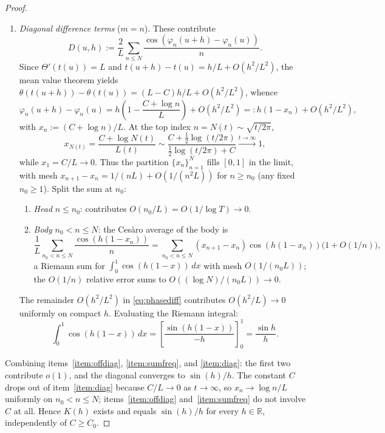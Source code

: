 \documentclass[12pt]{amsart}
\theoremstyle{remark}
\begin{document}
\begin{proof}
\begin{enumerate}
\item\label{item:diag}
\emph{Diagonal difference terms} ($m=n$).  These contribute
\[
  D(u,h):=\frac{2}{L}\sum_{n\leq N}\frac{\cos(\varphi_n(u+h)-\varphi_n(u))}{n}.
\]
Since $\Theta'(t(u))=L$ and $t(u+h)-t(u)=h/L+O(h^2/L^2)$, the mean
value theorem yields $\theta(t(u+h))-\theta(t(u))=(L-C)h/L+O(h^2/L^2)$,
whence
\begin{equation}\label{eq:phasediff}
  \varphi_n(u+h)-\varphi_n(u)
  =h\!\left(1-\frac{C+\log n}{L}\right)+O(h^2/L^2)
  =:h(1-x_n)+O(h^2/L^2),
\end{equation}
with $x_n:=(C+\log n)/L$.  At the top index $n=N(t)\sim\sqrt{t/2\pi}$,
\[
  x_{N(t)}=\frac{C+\log N(t)}{L(t)}
  \sim\frac{C+\tfrac12\log(t/2\pi)}{\tfrac12\log(t/2\pi)+C}
  \xrightarrow{t\to\infty}1,
\]
while $x_1=C/L\to 0$.  Thus the partition $\{x_n\}_{n=1}^{N}$ fills
$[0,1]$ in the limit, with mesh $x_{n+1}-x_n=1/(nL)+O(1/(n^2L))$ for
$n\geq n_0$ (any fixed $n_0\geq 1$).  Split the sum at $n_0$:
\begin{enumerate}
\item\label{item:head}
\emph{Head} $n\leq n_0$: contributes $O(n_0/L)=O(1/\log T)\to 0$.

\item\label{item:body}
\emph{Body} $n_0<n\leq N$: the Ces\`aro average of the body is
\[
  \frac{1}{L}\sum_{n_0<n\leq N}\frac{\cos(h(1-x_n))}{n}
  =\sum_{n_0<n\leq N}(x_{n+1}-x_n)\cos(h(1-x_n))\bigl(1+O(1/n)\bigr),
\]
a Riemann sum for $\int_0^1\cos(h(1-x))\,dx$ with mesh $O(1/(n_0 L))$;
the $O(1/n)$ relative error sums to $O((\log N)/(n_0 L))\to 0$.
\end{enumerate}
The remainder $O(h^2/L^2)$ in \eqref{eq:phasediff} contributes
$O(h^2/L)\to 0$ uniformly on compact $h$.  Evaluating the Riemann
integral:
\begin{equation}\label{eq:diagonal}
  \int_0^1\cos(h(1-x))\,dx
  =\left[\frac{\sin(h(1-x))}{-h}\right]_0^1=\frac{\sin h}{h}.
\end{equation}

\end{enumerate}

Combining items~\ref{item:offdiag}, \ref{item:sumfreq}, and
\ref{item:diag}: the first two contribute $o(1)$, and the diagonal
converges to $\sin(h)/h$.  The constant $C$ drops out of
item~\ref{item:diag} because $C/L\to 0$ as $t\to\infty$, so
$x_n\to\log n/L$ uniformly on $n_0<n\leq N$; items~\ref{item:offdiag}
and~\ref{item:sumfreq} do not involve $C$ at all.  Hence $K(h)$ exists
and equals $\sin(h)/h$ for every $h\in\mathbb{R}$, independently of
$C\geq C_0$.
\end{proof}
\end{document}
